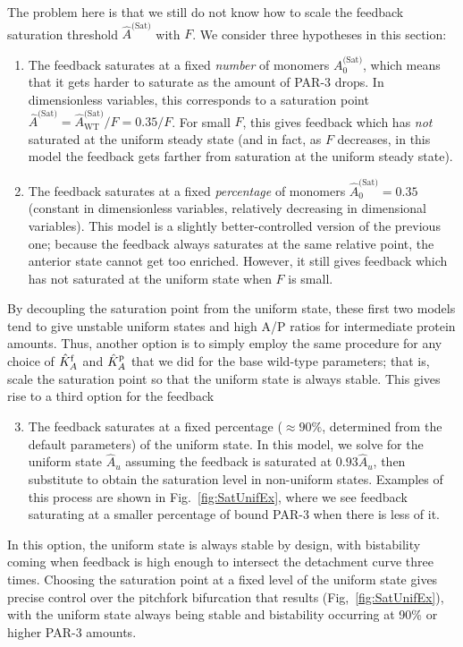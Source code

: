 \documentclass[11pt]{article}
\newcommand{\6}[1]{#1_{\text{6}}}
\newcommand{\3}[1]{#1_{\text{3}}}
\newcommand{\Sat}[1]{#1^\text{(Sat)}}
\begin{document}
The problem here is that we still do not know how to scale the feedback saturation threshold $\Sat{\hat A}$ with $F$. We consider three hypotheses in this section:
\begin{enumerate}
\item The feedback saturates at a fixed \emph{number} of monomers $\Sat{A}_0$, which means that it gets harder to saturate as the amount of PAR-3 drops. In dimensionless variables, this corresponds to a saturation point $\Sat{\hat A}=\Sat{\hat A}_\text{WT}/F=0.35/F$. For small $F$, this gives feedback which has \emph{not} saturated at the uniform steady state (and in fact, as $F$ decreases, in this model the feedback gets farther from saturation at the uniform steady state). 
\item The feedback saturates at a fixed \emph{percentage} of monomers $\Sat{\hat A}_0=0.35$ (constant in dimensionless variables, relatively decreasing in dimensional variables). This model is a slightly better-controlled version of the previous one; because the feedback always saturates at the same relative point, the anterior state cannot get too enriched. However, it still gives feedback which has not saturated at the uniform state when $F$ is small. 
\end{enumerate}
By decoupling the saturation point from the uniform state, these first two models tend to give unstable uniform states and high A/P ratios for intermediate protein amounts. Thus, another option is to simply employ the same procedure for any choice of $\hat{K}^\text{f}_A$ and $\hat{K}^\text{p}_A$ that we did for the base wild-type parameters; that is, scale the saturation point so that the uniform state is always stable. This gives rise to a third option for the feedback
\begin{enumerate}
  \setcounter{enumi}{2}
\item The feedback saturates at a fixed percentage ($\approx 90\%$, determined from the default parameters) of the uniform state. In this model, we solve for the uniform state $\hat A_u$ assuming the feedback is saturated at $0.93\hat A_u$, then substitute to obtain the saturation level in non-uniform states. Examples of this process are shown in Fig.\ \ref{fig:SatUnifEx}, where we see feedback saturating at a smaller percentage of bound PAR-3 when there is less of it. 
\end{enumerate}
In this option, the uniform state is always stable by design, with bistability coming when feedback is high enough to intersect the detachment curve three times. Choosing the saturation point at a fixed level of the uniform state gives precise control over the pitchfork bifurcation that results (Fig,\ \ref{fig:SatUnifEx}), with the uniform state always being stable and bistability occurring at 90\% or higher PAR-3 amounts. 
\end{document}
